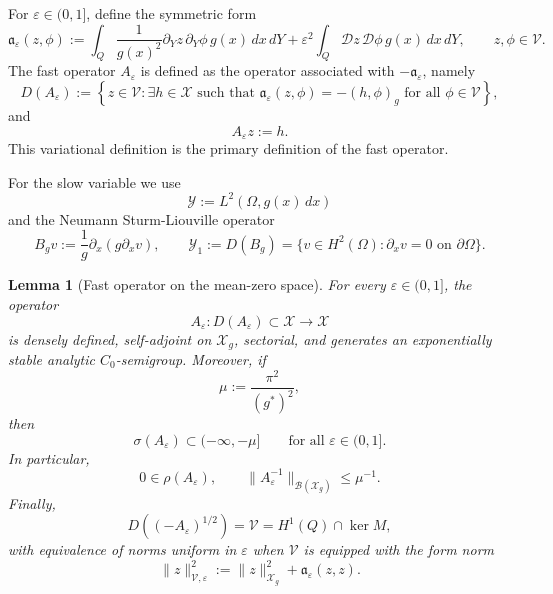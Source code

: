 \documentclass[11pt]{article}
\newtheorem{lemma}[theorem]{Lemma}
\theoremstyle{definition}
\theoremstyle{remark}
\numberwithin{equation}{section}
\begin{document}
For \(\varepsilon\in(0,1]\), define the symmetric form
\[
\mathfrak a_\varepsilon(z,\phi)
:=
\int_Q \frac1{g(x)^2}\partial_Yz\,\partial_Y\phi\,g(x)\,dx\,dY
+
\varepsilon^2
\int_Q \mathcal Dz\,\mathcal D\phi\,g(x)\,dx\,dY,
\qquad
z,\phi\in \mathcal V.
\]
The fast operator \(A_\varepsilon\) is defined as the operator associated with
\(-\mathfrak a_\varepsilon\), namely
\[
D(A_\varepsilon)
:=
\left\{
z\in \mathcal V:
\exists h\in\mathcal X
\text{ such that }
\mathfrak a_\varepsilon(z,\phi)=-(h,\phi)_g
\text{ for all }\phi\in\mathcal V
\right\},
\]
and
\[
A_\varepsilon z:=h.
\]
This variational definition is the primary definition of the fast operator.

For the slow variable we use
\[
\mathcal Y:=L^2(\Omega,g(x)\,dx)
\]
and the Neumann Sturm-Liouville operator
\[
B_gv:=\frac1g\partial_x(g\partial_xv),
\qquad
\mathcal Y_1:=D(B_g)
=
\{v\in H^2(\Omega):\partial_xv=0\text{ on }\partial\Omega\}.
\]

\begin{lemma}[Fast operator on the mean-zero space]
\label{lem:fast-operator-thin-domain}
For every \(\varepsilon\in(0,1]\), the operator
\[
A_\varepsilon:D(A_\varepsilon)\subset\mathcal X\to\mathcal X
\]
is densely defined, self-adjoint on \(\mathcal X_g\), sectorial, and generates
an exponentially stable analytic \(C_0\)-semigroup. Moreover, if
\[
\mu:=\frac{\pi^2}{(g^*)^2},
\]
then
\[
\sigma(A_\varepsilon)\subset(-\infty,-\mu]
\qquad\text{for all }\varepsilon\in(0,1].
\]
In particular,
\[
0\in\rho(A_\varepsilon),
\qquad
\|A_\varepsilon^{-1}\|_{\mathcal B(\mathcal X_g)}
\le
\mu^{-1}.
\]
Finally,
\[
D((-A_\varepsilon)^{1/2})
=
\mathcal V
=
H^1(Q)\cap\ker M,
\]
with equivalence of norms uniform in \(\varepsilon\) when \(\mathcal V\) is
equipped with the form norm
\[
\|z\|_{\mathcal V,\varepsilon}^2
:=
\|z\|_{\mathcal X_g}^2+\mathfrak a_\varepsilon(z,z).
\]
\end{lemma}
\end{document}
